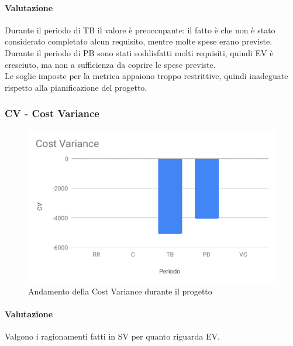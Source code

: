 \paragraph*{Valutazione}
Durante il periodo di TB il valore è preoccupante: il fatto è che non è stato considerato completato alcun requisito, mentre molte spese erano previste.\\
Durante il periodo di PB sono stati soddisfatti molti requisiti, quindi EV è cresciuto, ma non a sufficienza da coprire le spese previste.\\
Le soglie imposte per la metrica appaiono troppo restrittive, quindi inadeguate rispetto alla pianificazione del progetto.

\subsubsection{CV - Cost Variance}
\begin{figure}[H]
	\centering
	\includegraphics[scale=0.7]{res/images/RA/cv.pdf}
	\caption{Andamento della Cost Variance durante il progetto}
\end{figure}
\paragraph*{Valutazione}
Valgono i ragionamenti fatti in SV per quanto riguarda EV.




